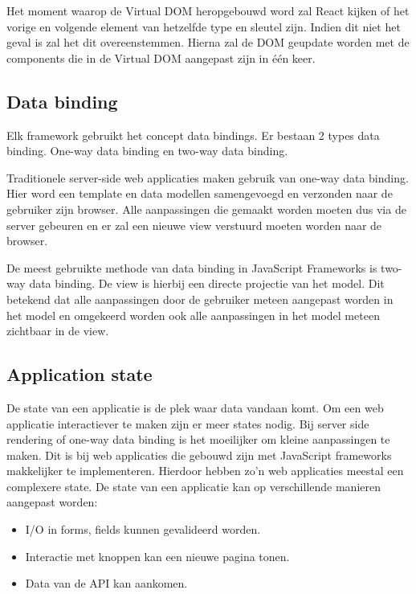 Het moment waarop de Virtual DOM heropgebouwd word zal React kijken of het vorige en volgende element van hetzelfde type en sleutel zijn. Indien dit niet het geval is zal het dit overeenstemmen. Hierna zal de DOM geupdate worden met de components die in de Virtual DOM aangepast zijn in één keer.

\subsection{Data binding}
\label{sec:Data_Binding}
Elk framework gebruikt het concept data bindings. Er bestaan 2 types data binding. One-way data binding en two-way data binding.

Traditionele server-side web applicaties maken gebruik van one-way data binding. Hier word een template en data modellen samengevoegd en verzonden naar de gebruiker zijn browser. Alle aanpassingen die gemaakt worden moeten dus via de server gebeuren en er zal een nieuwe view verstuurd moeten worden naar de browser.

De meest gebruikte methode van data binding in JavaScript Frameworks is two-way data binding. De view is hierbij een directe projectie van het model. Dit betekend dat alle aanpassingen door de gebruiker meteen aangepast worden in het model en omgekeerd worden ook alle aanpassingen in het model meteen zichtbaar in de view.

\subsection{Application state}
\label{sec:Application_state}
De state van een applicatie is de plek waar data vandaan komt. Om een web applicatie interactiever te maken zijn er meer states nodig. Bij server side rendering of one-way data binding is het moeilijker om kleine aanpassingen te maken. Dit is bij web applicaties die gebouwd zijn met JavaScript frameworks makkelijker te implementeren. Hierdoor hebben zo’n web applicaties meestal een complexere state. De state van een applicatie kan op verschillende manieren aangepast worden:

\begin{itemize}
	\item I/O in forms, fields kunnen gevalideerd worden.
	\item Interactie met knoppen kan een nieuwe pagina tonen.
	\item Data van de API kan aankomen.
\end{itemize}

